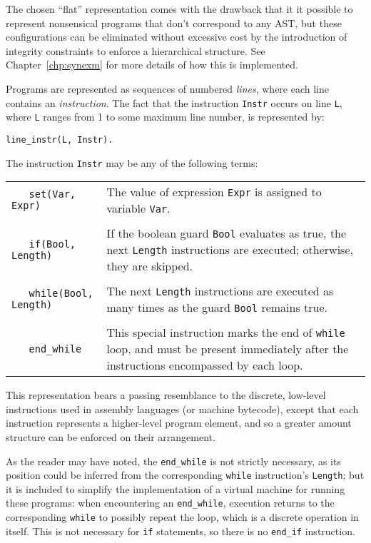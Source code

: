 \documentclass[a4paper,twoside,notitlepage]{report}
\begin{document}
The chosen ``flat'' representation comes with the drawback that it it 
possible to represent nonsensical programs that don't correspond to any 
AST, but these configurations can be eliminated without excessive cost by 
the introduction of integrity constraints to enforce a hierarchical 
structure. See Chapter~\ref{chp:synexm} for more details of how this is 
implemented.

Programs are represented as sequences of numbered \emph{lines}, where each 
line contains an \emph{instruction}. The fact that the instruction 
\verb|Instr| occurs on line \verb|L|, where \verb|L| ranges from 1 to some 
maximum line number, is represented by:
\begin{Verbatim}[samepage=true]
    line_instr(L, Instr).
\end{Verbatim}

The instruction \verb|Instr| may be any of the following terms:

\begin{tabularx}{\textwidth}{lX}
    \verb|   set(Var, Expr)|
&   The value of expression \verb|Expr| is assigned to variable \verb|Var|.
\\
\\  \verb|   if(Bool, Length)|
&   If the boolean guard \verb|Bool| evaluates as true, the next \verb|Length|
    instructions are executed; otherwise, they are skipped.
\\
\\  \verb|   while(Bool, Length)|
&   The next \verb|Length| instructions are executed as many times as the 
    guard \verb|Bool| remains true.
\\
\\  \verb|   end_while|
&   This special instruction marks the end of \verb|while| loop, and must 
    be present immediately after the instructions encompassed by each loop.
\end{tabularx}

This representation bears a passing resemblance to the discrete, low-level 
instructions used in assembly languages (or machine bytecode), except that 
each instruction represents a higher-level program element, and so a greater 
amount structure can be enforced on their arrangement.

As the reader may have noted, the \verb|end_while| is not strictly necessary, 
as its position could be inferred from the corresponding \verb|while| 
instruction's \verb|Length|; but it is included to simplify the implementation 
of a virtual machine for running these programs: when encountering an 
\verb|end_while|, execution returns to the corresponding \verb|while| to 
possibly repeat the loop, which is a discrete operation in itself. This is not 
necessary for \verb|if| statements, so there is no \verb|end_if| instruction.
\end{document}
